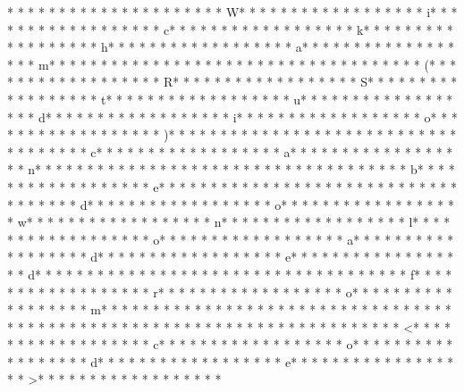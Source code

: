 * *  *  * * *  * * *  * * *  *  * * *  *  * * *  * W* * *  * * *  * * *  *  * * *  *  * * *  * i* * *  * * *  * * *  *  * * *  *  * * *  * c* * *  * * *  * * *  *  * * *  *  * * *  * k* * *  * * *  * * *  *  * * *  *  * * *  * h* * *  * * *  * * *  *  * * *  *  * * *  * a* * *  * * *  * * *  *  * * *  *  * * *  * m* * *  * * *  * * *  *  * * *  *  * * *  *  * * *  * * *  * * *  *  * * *  *  * * *  * (* * *  * * *  * * *  *  * * *  *  * * *  * R* * *  * * *  * * *  *  * * *  *  * * *  * S* * *  * * *  * * *  *  * * *  *  * * *  * t* * *  * * *  * * *  *  * * *  *  * * *  * u* * *  * * *  * * *  *  * * *  *  * * *  * d* * *  * * *  * * *  *  * * *  *  * * *  * i* * *  * * *  * * *  *  * * *  *  * * *  * o* * *  * * *  * * *  *  * * *  *  * * *  * )* * *  * * *  * * *  *  * * *  *  * * *  *  * * *  * * *  * * *  *  * * *  *  * * *  * c* * *  * * *  * * *  *  * * *  *  * * *  * a* * *  * * *  * * *  *  * * *  *  * * *  * n* * *  * * *  * * *  *  * * *  *  * * *  *  * * *  * * *  * * *  *  * * *  *  * * *  * b* * *  * * *  * * *  *  * * *  *  * * *  * e* * *  * * *  * * *  *  * * *  *  * * *  *  * * *  * * *  * * *  *  * * *  *  * * *  * d* * *  * * *  * * *  *  * * *  *  * * *  * o* * *  * * *  * * *  *  * * *  *  * * *  * w* * *  * * *  * * *  *  * * *  *  * * *  * n* * *  * * *  * * *  *  * * *  *  * * *  * l* * *  * * *  * * *  *  * * *  *  * * *  * o* * *  * * *  * * *  *  * * *  *  * * *  * a* * *  * * *  * * *  *  * * *  *  * * *  * d* * *  * * *  * * *  *  * * *  *  * * *  * e* * *  * * *  * * *  *  * * *  *  * * *  * d* * *  * * *  * * *  *  * * *  *  * * *  *  * * *  * * *  * * *  *  * * *  *  * * *  * f* * *  * * *  * * *  *  * * *  *  * * *  * r* * *  * * *  * * *  *  * * *  *  * * *  * o* * *  * * *  * * *  *  * * *  *  * * *  * m* * *  * * *  * * *  *  * * *  *  * * *  *  * * *  * * *  * * *  *  * * *  *  * * *  * 
* * *  * * *  * * *  *  * * *  *  * * *  * 	* * *  * * *  * * *  *  * * *  *  * * *  * <* * *  * * *  * * *  *  * * *  *  * * *  * c* * *  * * *  * * *  *  * * *  *  * * *  * o* * *  * * *  * * *  *  * * *  *  * * *  * d* * *  * * *  * * *  *  * * *  *  * * *  * e* * *  * * *  * * *  *  * * *  *  * * *  * >* * *  * * *  * * *  *  * * *  *  * * *  * 
